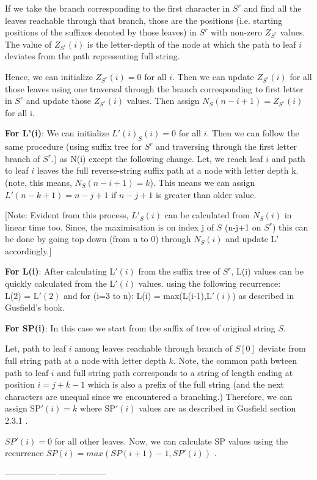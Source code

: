 \documentclass[a4paper,11pt]{article}
\begin{document}
 If we take the branch corresponding to the first character in $S^r$ and find all the leaves reachable through that branch, those are the positions (i.e. starting positions of the suffixes denoted by those leaves) in $S^r$ with non-zero $Z_{S^r}$ values. The value of  $Z_{S^r}(i)$ is the letter-depth of the node at which the path to leaf $i$ deviates from the path representing full string.
 
 Hence, we can initialize $Z_{S^r}(i) = 0$ for all $i$. Then we can update $Z_{S^r}(i)$ for all those leaves using one traversal through the branch corresponding to first letter in $S^r$ and update  those $Z_{S^r}(i)$ values. Then assign $N_S(n - i + 1) = Z_{S^r}(i)$ for all i. 
 
  \textbf{For L'(i)}:
 We can initialize $L'(i)_{S}(i) = 0$ for all $i$. Then we can follow the same procedure (using suffix tree for $S^r$ and traversing through the first letter branch of $S^r$.) as N(i) except the following change. Let, we reach leaf $i$ and path to leaf $i$ leaves the full reverse-string suffix path at a node with letter depth k. (note, this means, $N_S(n-i+1)=k$).  This means we can assign $L'(n-k+1) = n-j+1$  if $n-j+1$ is greater than older value. 
 
 [Note: Evident from this process, $L'_S(i)$ can be calculated from $N_S(i)$ in linear time too. Since, the maximisation is on index j of $S$ (n-j+1 on $S^r$) this can be done by going top down (from n to 0) through $N_S(i)$ and update L' accordingly.]
 
\textbf{For L(i)}:
After calculating L$'(i)$ from the suffix tree of $S^r$, L(i) values can be quickly calculated from the L$'(i)$ values. using the following recurrence:\\
L(2) = L$'(2)$ and    for (i=3 to n): L(i) = max(L(i-1),L$'(i)$) as described in Gusfield's book.

 \textbf{For SP(i)}:
 In this case we start from the suffix of tree of original string $S$. %
 
 Let, path to leaf $i$ among leaves reachable through branch of $S[0]$ deviate from full string path at a node with letter depth $k$. Note, the common path bwteen path to leaf $i$ and full string path corresponds to a string of length ending at position $i = j + k - 1$ which is also a prefix of the full string (and the next characters are unequal since we encountered a branching.)
 Therefore,  we can assign SP$'(i) = k$ where SP$'(i)$ values are as described in Gusfield section 2.3.1 . 
 
 $SP'(i) = 0$ for all other leaves. Now, we can calculate SP values using the recurrence $SP(i) = max(SP(i+1)-1,SP'(i))$ .
 

\begin{center}

 ------------------ -----------------
\end{center}
\end{document}
